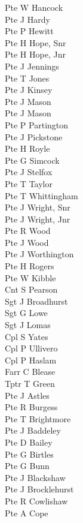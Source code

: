 \begin{multicols}{3}
  Pte W Hancock \\
  Pte J Hardy \\
  Pte P Hewitt \\
  Pte H Hope, Snr \\
  Pte H Hope, Jnr \\
  Pte J Jennings \\
  Pte T Jones \\
  Pte J Kinsey \\
  Pte J Mason \\
  Pte J Mason \\
  Pte P Partington \\
  Pte J Pickstone \\
  Pte H Royle \\
  Pte G Simcock \\
  Pte J Stelfox \\
  Pte T Taylor \\
  Pte T Whittingham \\
  Pte J Wright, Snr \\
  Pte J Wright, Jnr \\
  Pte R Wood \\
  Pte J Wood \\
  Pte J Worthington \\
  Pte H Rogers \\
  Pte W Kibble \\
  Cnt S Pearson \\
  Sgt J Broadhurst \\
  Sgt G Lowe \\
  Sgt J Lomas \\
  Cpl S Yates \\
  Cpl P Ullivero \\
  Cpl P Haslam \\
  Farr C Blease \\
  Tptr T Green \\
  Pte J Astles \\
  Pte R Burgess \\
  Pte T Brightmore \\
  Pte J Baddeley \\
  Pte D Bailey \\
  Pte G Birtles \\
  Pte G Bunn \\
  Pte J Blackshaw \\
  Pte J Brocklehurst \\
  Pte R Cowlishaw \\
  Pte A Cope \\

\end{multicols}
